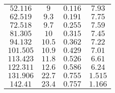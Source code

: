 \begin{tabular}{c c c c}
\(52.116\) & \(9\) & \(0.116\) & \(7.93\) \\ 
\(62.519\) & \(9.3\) & \(0.191\) & \(7.75\) \\ 
\(72.518\) & \(9.7\) & \(0.255\) & \(7.59\) \\ 
\(81.305\) & \(10\) & \(0.315\) & \(7.45\) \\ 
\(94.132\) & \(10.5\) & \(0.362\) & \(7.22\) \\ 
\(101.505\) & \(10.9\) & \(0.429\) & \(7.01\) \\ 
\(113.423\) & \(11.8\) & \(0.526\) & \(6.61\) \\ 
\(122.311\) & \(12.6\) & \(0.586\) & \(6.24\) \\ 
\(131.906\) & \(22.7\) & \(0.755\) & \(1.515\) \\ 
\(142.41\) & \(23.4\) & \(0.757\) & \(1.166\)
\end{tabular}